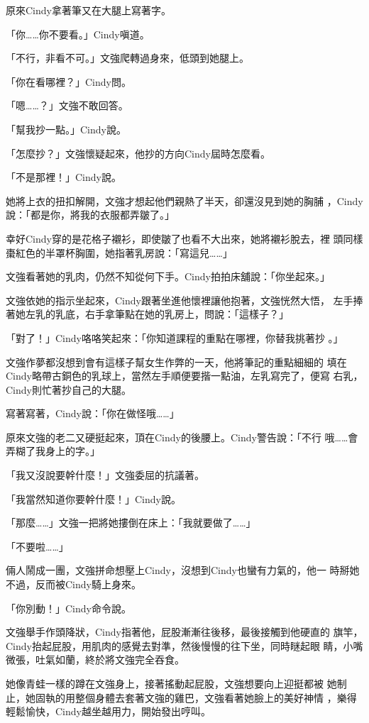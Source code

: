 原來Cindy拿著筆又在大腿上寫著字。

「你……你不要看。」Cindy嗔道。

「不行，非看不可。」文強爬轉過身來，低頭到她腿上。

「你在看哪裡？」Cindy問。

「嗯……？」文強不敢回答。

「幫我抄一點。」Cindy說。

「怎麼抄？」文強懷疑起來，他抄的方向Cindy屆時怎麼看。

「不是那裡！」Cindy說。

她將上衣的扭扣解開，文強才想起他們親熱了半天，卻還沒見到她的胸脯
，Cindy說：「都是你，將我的衣服都弄皺了。」

幸好Cindy穿的是花格子襯衫，即使皺了也看不大出來，她將襯衫脫去，裡
頭同樣棗紅色的半罩杯胸圍，她指著乳房說：「寫這兒……」

文強看著她的乳肉，仍然不知從何下手。Cindy拍拍床舖說：「你坐起來。」

文強依她的指示坐起來，Cindy跟著坐進他懷裡讓他抱著，文強恍然大悟，
左手捧著她左乳的乳底，右手拿筆點在她的乳房上，問說：「這樣子？」

「對了！」Cindy咯咯笑起來：「你知道課程的重點在哪裡，你替我挑著抄
。」

文強作夢都沒想到會有這樣子幫女生作弊的一天，他將筆記的重點細細的
填在Cindy略帶古銅色的乳球上，當然左手順便要揩一點油，左乳寫完了，便寫
右乳，Cindy則忙著抄自己的大腿。

寫著寫著，Cindy說：「你在做怪哦……」

原來文強的老二又硬挺起來，頂在Cindy的後腰上。Cindy警告說：「不行
哦……會弄糊了我身上的字。」

「我又沒說要幹什麼！」文強委屈的抗議著。

「我當然知道你要幹什麼！」Cindy說。

「那麼……」文強一把將她摟倒在床上：「我就要做了……」

「不要啦……」

倆人鬧成一團，文強拼命想壓上Cindy，沒想到Cindy也蠻有力氣的，他一
時掰她不過，反而被Cindy騎上身來。

「你別動！」Cindy命令說。

文強舉手作頭降狀，Cindy指著他，屁股漸漸往後移，最後接觸到他硬直的
旗竿，Cindy抬起屁股，用肌肉的感覺去對準，然後慢慢的往下坐，同時瞇起眼
睛，小嘴微張，吐氣如蘭，終於將文強完全吞食。

她像青蛙一樣的蹲在文強身上，接著搖動起屁股，文強想要向上迎挺都被
她制止，她固執的用整個身體去套著文強的雞巴，文強看著她臉上的美好神情
，樂得輕鬆愉快，Cindy越坐越用力，開始發出哼叫。

